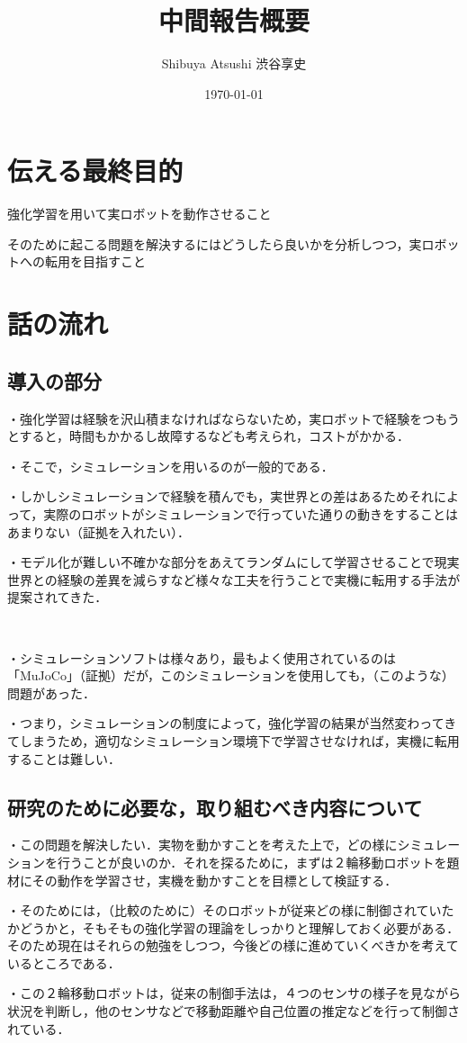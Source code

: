 \documentclass[a4paper,11pt]{jsarticle}
\begin{document}
\title{中間報告概要}
\author{Shibuya Atsushi 渋谷享史}
\date{\today}
\maketitle

\section{伝える最終目的}
強化学習を用いて実ロボットを動作させること\par
そのために起こる問題を解決するにはどうしたら良いかを分析しつつ，実ロボットへの転用を目指すこと
\section{話の流れ}
\subsection{導入の部分}
・強化学習は経験を沢山積まなければならないため，実ロボットで経験をつもうとすると，時間もかかるし故障するなども考えられ，コストがかかる．\par
・そこで，シミュレーションを用いるのが一般的である．\par
・しかしシミュレーションで経験を積んでも，実世界との差はあるためそれによって，実際のロボットがシミュレーションで行っていた通りの動きをすることはあまりない（証拠を入れたい）．\par
・モデル化が難しい不確かな部分をあえてランダムにして学習させることで現実世界との経験の差異を減らすなど様々な工夫を行うことで実機に転用する手法が提案されてきた．\par
　\par
・シミュレーションソフトは様々あり，最もよく使用されているのは「MuJoCo」（証拠）だが，このシミュレーションを使用しても，（このような）問題があった．\par
・つまり，シミュレーションの制度によって，強化学習の結果が当然変わってきてしまうため，適切なシミュレーション環境下で学習させなければ，実機に転用することは難しい．\par
\subsection{研究のために必要な，取り組むべき内容について}
・この問題を解決したい．実物を動かすことを考えた上で，どの様にシミュレーションを行うことが良いのか．それを探るために，まずは２輪移動ロボットを題材にその動作を学習させ，実機を動かすことを目標として検証する．\par
・そのためには，（比較のために）そのロボットが従来どの様に制御されていたかどうかと，そもそもの強化学習の理論をしっかりと理解しておく必要がある．そのため現在はそれらの勉強をしつつ，今後どの様に進めていくべきかを考えているところである．\par
・この２輪移動ロボットは，従来の制御手法は，４つのセンサの様子を見ながら状況を判断し，他のセンサなどで移動距離や自己位置の推定などを行って制御されている．\par
\end{document}
